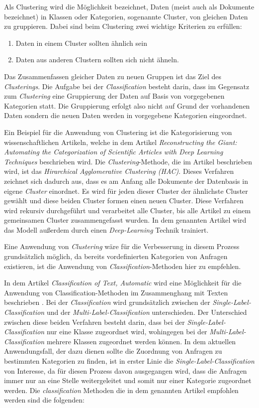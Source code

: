 Als Clustering wird die Möglichkeit bezeichnet,  Daten (meist auch als Dokumente bezeichnet) in Klassen oder Kategorien, sogenannte Cluster, von gleichen Daten zu gruppieren. Dabei sind beim Clustering zwei wichtige Kriterien zu erfüllen:

\begin{enumerate}
	\item Daten in einem Cluster sollten ähnlich sein
	\item Daten aus anderen Clustern sollten sich nicht ähneln.
\end{enumerate}
Das Zusammenfassen gleicher Daten zu neuen Gruppen ist das Ziel des \textit{Clusterings}. Die Aufgabe bei der \textit{Classification} besteht darin, dass im Gegensatz zum \textit{Clustering} eine Gruppierung der Daten auf Basis von vorgegebenen Kategorien statt. Die Gruppierung erfolgt also nicht auf Grund der vorhandenen Daten sondern die neuen Daten werden in vorgegebene Kategorien eingeordnet.

Ein Beispiel für die Anwendung von Clustering ist die Kategorisierung von wissenschaftlichen Artikeln, welche in dem Artikel \textit{Reconstructing the Giant: Automating the Categorization of Scientific Articles with Deep Learning Techniques} \cite{DannReconstructing} beschrieben wird. Die \textit{Clustering}-Methode, die im Artikel beschrieben wird, ist das \textit{Hirarchical Agglomerative Clustering (HAC)}. Dieses Verfahren zeichnet sich dadurch aus, dass es am Anfang alle Dokumente der Datenbasis in eigene \textit{Cluster} einordnet. Es wird für jeden dieser Cluster der ähnlichste Cluster gewählt und diese beiden Cluster formen einen neuen Cluster. Diese Verfahren wird rekursiv durchgeführt und verarbeitet alle Cluster, bis alle Artikel zu einem gemeinsamen Cluster zusammengefasst wurden. In dem genannten Artikel wird das Modell außerdem durch einen \textit{Deep-Learning} Technik trainiert. 

Eine Anwendung von \textit{Clustering} wäre für die Verbesserung in diesem Prozess grundsätzlich möglich, da bereits vordefinierten Kategorien von Anfragen existieren, ist die Anwendung von \textit{Classification}-Methoden hier zu empfehlen. 

In dem Artikel \textit{Classification of Text, Automatic} wird eine Möglichkeit für die Anwendung von Classification-Methoden im Zusammenghang mit Texten beschrieben \cite{sebastiani2006classification}. Bei der \textit{Classification} wird grundsätzlich zwischen der \textit{Single-Label-Classification} und der \textit{Multi-Label-Classification} unterschieden. Der Unterschied zwischen diese beiden Verfahren besteht darin, dass bei der \textit{Single-Label-Classification} nur eine Klasse zugeordnet wird, wohingegen bei der \textit{Multi-Label-Classification} mehrere Klassen zugeordnet werden können. In dem aktuellen Anwendungsfall, der dazu dienen sollte die Zuordnung von Anfragen zu bestimmten Kategorien zu finden, ist in erster Linie die \textit{Single-Label-Classification} von Interesse, da für diesen Prozess davon ausgegangen wird, dass die Anfragen immer nur an eine Stelle weitergeleitet und somit nur einer Kategorie zugeordnet werden. Die \textit{classification} Methoden die in dem genannten Artikel empfohlen werden sind die folgenden:

